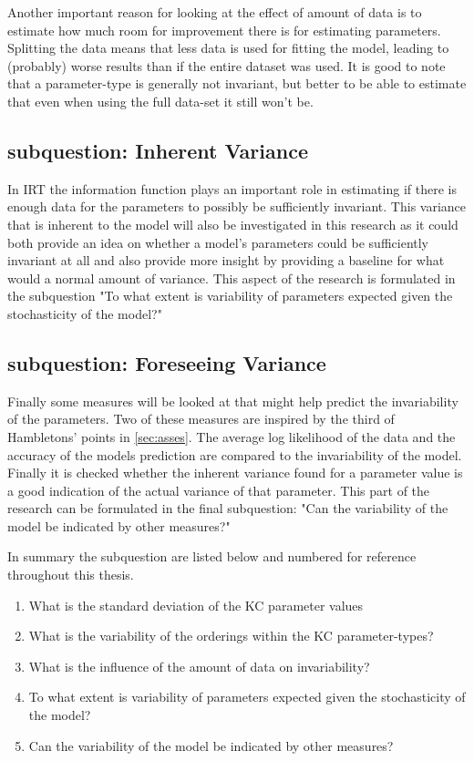 \documentclass{scrartcl}
\begin{document}
Another important reason for looking at the effect of amount of data is to estimate how much room for improvement there is for estimating parameters. Splitting the data means that less data is used for fitting the model, leading to (probably) worse results than if the entire dataset was used. It is good to note that a parameter-type is generally not invariant, but better to be able to estimate that even when using the full data-set it still won't be.

\subsection{subquestion: Inherent Variance}
In IRT the information function plays an important role in estimating if there is enough data for the parameters to possibly be sufficiently invariant. This variance that is inherent to the model will also be investigated in this research as it could both provide an idea on whether a model's parameters could be sufficiently invariant at all and also provide more insight by providing a baseline for what would a normal amount of variance. This aspect of the research is formulated in the subquestion "To what extent is variability of parameters expected given the stochasticity of the model?"

\subsection{subquestion: Foreseeing Variance}
Finally some measures will be looked at that might help predict the invariability of the parameters. Two of these measures are inspired by the third of Hambletons' points in \ref{sec:asses}. The average log likelihood of the data and the accuracy of the models prediction are compared to the invariability of the model. Finally it is checked whether the inherent variance found for a parameter value is a good indication of the actual variance of that parameter. This part of the research can be formulated in the final subquestion: "Can the variability of the model be indicated by other measures?"

In summary the subquestion are listed below and numbered for reference throughout this thesis.
\begin{enumerate}
  \item What is the standard deviation of the KC parameter values
  \item What is the variability of the orderings within the KC parameter-types?
  \item What is the influence of the amount of data on invariability?
  \item To what extent is variability of parameters expected given the stochasticity of the model?
  \item Can the variability of the model be indicated by other measures?
\end{enumerate}
\end{document}
